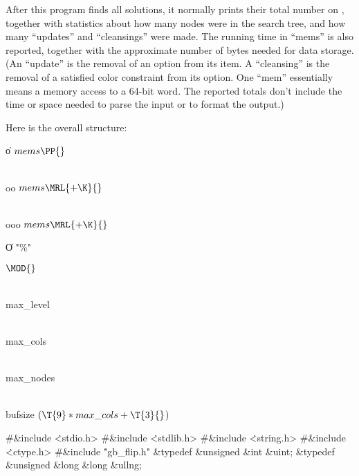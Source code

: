 \fi

After this program finds all solutions, it normally prints their total
number on , together with statistics about how many
nodes were in the search tree, and how many ``updates'' and
``cleansings'' were made.
The running time in ``mems'' is also reported, together with the approximate
number of bytes needed for data storage.
(An ``update'' is the removal of an option from its item.
A ``cleansing'' is the removal of a satisfied color constraint from its option.
One ``mem'' essentially means a memory access to a 64-bit word.
The reported totals don't include the time or space needed to parse the
input or to format the output.)

Here is the overall structure:

\Y\B\4\D\|o\5
$\\{mems}\PP{}$\par
\B\4\D\\{oo}\5
$\\{mems}\MRL{+{\K}}{}$\par
\B\4\D\\{ooo}\5
$\\{mems}\MRL{+{\K}}{}$\par
\B\4\D\|O\5
\.{"\%"}\par
\B\4\D\Xmod\5
$\MOD{}$\par
\B\4\D\\{max\_level}\5
\par
\B\4\D\\{max\_cols}\5
\par
\B\4\D\\{max\_nodes}\5
\par
\B\4\D\\{bufsize}\5
$(\T{9}*\\{max\_cols}+\T{3}{}$)%
\par
\Y\B\8\#\&{include} \.{<stdio.h>}\6
\8\#\&{include} \.{<stdlib.h>}\6
\8\#\&{include} \.{<string.h>}\6
\8\#\&{include} \.{<ctype.h>}\6
\8\#\&{include} \.{"gb\_flip.h"}\6
\&{typedef} \&{unsigned} \&{int} \&{uint};\6
\&{typedef} \&{unsigned} \&{long} \&{long} \&{ullng};\7
